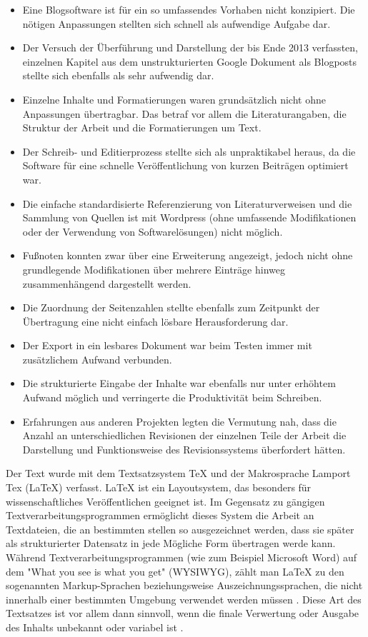 \begin{itemize}
\item Eine Blogsoftware ist für ein so umfassendes Vorhaben nicht konzipiert. Die nötigen Anpassungen stellten sich schnell als aufwendige Aufgabe dar.
\item Der Versuch der Überführung und Darstellung der bis Ende 2013 verfassten, einzelnen Kapitel aus dem unstrukturierten Google Dokument als Blogposts stellte sich ebenfalls als sehr aufwendig dar.
\item  Einzelne Inhalte und Formatierungen waren grundsätzlich nicht ohne Anpassungen übertragbar. Das betraf vor allem die Literaturangaben, die Struktur der Arbeit und die Formatierungen um Text.
\item Der Schreib- und Editierprozess stellte sich als unpraktikabel heraus, da die Software für eine schnelle Veröffentlichung von kurzen Beiträgen optimiert war.
\item Die einfache standardisierte Referenzierung von Literaturverweisen und die Sammlung von Quellen ist mit Wordpress (ohne umfassende Modifikationen oder der Verwendung von Softwarelösungen) nicht möglich.
\item Fußnoten konnten zwar über eine Erweiterung angezeigt, jedoch nicht ohne grundlegende Modifikationen über mehrere Einträge hinweg zusammenhängend dargestellt werden.
\item Die Zuordnung der Seitenzahlen stellte ebenfalls zum Zeitpunkt der Übertragung eine nicht einfach lösbare Herausforderung dar.
\item Der Export in ein lesbares Dokument war beim Testen immer mit zusätzlichem Aufwand verbunden.
\item Die strukturierte Eingabe der Inhalte war ebenfalls nur unter erhöhtem Aufwand möglich und verringerte die Produktivität beim Schreiben.
\item Erfahrungen aus anderen Projekten legten die Vermutung nah, dass die Anzahl an unterschiedlichen Revisionen der einzelnen Teile der Arbeit die Darstellung und Funktionsweise des Revisionssystems überfordert hätten.
\end{itemize}

Der Text wurde mit dem Textsatzsystem TeX und der Makrosprache Lamport Tex (LaTeX) verfasst. LaTeX ist ein Layoutsystem, das besonders für wissenschaftliches Veröffentlichen geeignet ist. Im Gegensatz zu gängigen Textverarbeitungsprogrammen ermöglicht dieses System die Arbeit an Textdateien, die an bestimmten stellen so ausgezeichnet werden, dass sie später als strukturierter Datensatz in jede Mögliche Form übertragen werde kann. Während Textverarbeitungsprogrammen (wie zum Beispiel Microsoft Word) auf dem "What you see is what you get" (WYSIWYG), zählt man LaTeX zu den sogenannten Markup-­Sprachen beziehungsweise Auszeichnungssprachen, die nicht innerhalb einer bestimmten Umgebung verwendet werden müssen \cite{Sievers_2012}. Diese Art des Textsatzes ist vor allem dann sinnvoll, wenn die finale Verwertung oder Ausgabe des Inhalts unbekannt oder variabel ist  \cite{braune_2007_latex}.

